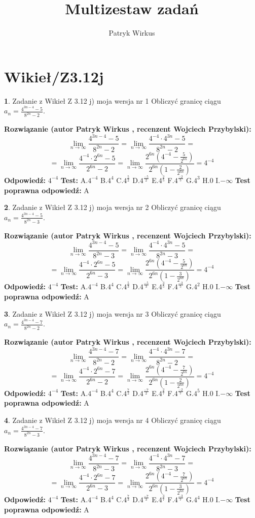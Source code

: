 \documentclass[12pt, a4paper]{article}
\title{Multizestaw zadań}
\author{Patryk Wirkus}
\date{}
\theoremstyle{definition} %
\newtheorem{zad}{}
\newcommand{\kategoria}[1]{\section{#1}}
\newcommand{\zadStart}[1]{\begin{zad}#1\newline}
\newcommand{\zadStop}{\end{zad}}
\newcommand{\rozwStart}[2]{\noindent \textbf{Rozwiązanie (autor #1 , recenzent #2): }\newline}
\newcommand{\rozwStop}{\newline}
\newcommand{\odpStart}{\noindent \textbf{Odpowiedź:}\newline}
\newcommand{\odpStop}{\newline}
\newcommand{\testStart}{\noindent \textbf{Test:}\newline}
\newcommand{\testStop}{\newline}
\newcommand{\kluczStart}{\noindent \textbf{Test poprawna odpowiedź:}\newline}
\newcommand{\kluczStop}{\newline}
\begin{document}
\maketitle

\kategoria{Wikieł/Z3.12j}


\zadStart{Zadanie z Wikieł Z 3.12 j) moja wersja nr 1}
Obliczyć granicę ciągu $a_{n}=\frac{4^{3n-4}-5}{8^{2n}-2}$.
\zadStop
\rozwStart{Patryk Wirkus}{Wojciech Przybylski}
$$\lim\limits_{n\to\infty}\frac{4^{3n-4}-5}{8^{2n}-2}= \lim\limits_{n\to\infty}\frac{4^{-4} \cdot 4^{3n}-5}{8^{2n}-2}=$$
$$= \lim\limits_{n\to\infty}\frac{4^{-4} \cdot 2^{6n}-5}{2^{6n}-2}= \lim\limits_{n\to\infty}\frac{2^{6n}(4^{-4} - \frac{5}{2^{6n}})}{2^{6n}(1-\frac{2}{2^{6n}})}= 4^{-4}$$
\rozwStop
\odpStart
$4^{-4}$
\odpStop
\testStart
A.$4^{-4}$
B.$4^{4}$
C.$4^{\frac{5}{2}}$
D.$4^{\frac{-5}{2}}$
E.$4^{\frac{2}{5}}$
F.$4^{\frac{-2}{5}}$
G.$4^{3}$
H.$0$
I.$-\infty$
\testStop
\kluczStart
A
\kluczStop



\zadStart{Zadanie z Wikieł Z 3.12 j) moja wersja nr 2}
Obliczyć granicę ciągu $a_{n}=\frac{4^{3n-4}-5}{8^{2n}-3}$.
\zadStop
\rozwStart{Patryk Wirkus}{Wojciech Przybylski}
$$\lim\limits_{n\to\infty}\frac{4^{3n-4}-5}{8^{2n}-3}= \lim\limits_{n\to\infty}\frac{4^{-4} \cdot 4^{3n}-5}{8^{2n}-3}=$$
$$= \lim\limits_{n\to\infty}\frac{4^{-4} \cdot 2^{6n}-5}{2^{6n}-3}= \lim\limits_{n\to\infty}\frac{2^{6n}(4^{-4} - \frac{5}{2^{6n}})}{2^{6n}(1-\frac{3}{2^{6n}})}= 4^{-4}$$
\rozwStop
\odpStart
$4^{-4}$
\odpStop
\testStart
A.$4^{-4}$
B.$4^{4}$
C.$4^{\frac{5}{3}}$
D.$4^{\frac{-5}{3}}$
E.$4^{\frac{3}{5}}$
F.$4^{\frac{-3}{5}}$
G.$4^{2}$
H.$0$
I.$-\infty$
\testStop
\kluczStart
A
\kluczStop



\zadStart{Zadanie z Wikieł Z 3.12 j) moja wersja nr 3}
Obliczyć granicę ciągu $a_{n}=\frac{4^{3n-4}-7}{8^{2n}-2}$.
\zadStop
\rozwStart{Patryk Wirkus}{Wojciech Przybylski}
$$\lim\limits_{n\to\infty}\frac{4^{3n-4}-7}{8^{2n}-2}= \lim\limits_{n\to\infty}\frac{4^{-4} \cdot 4^{3n}-7}{8^{2n}-2}=$$
$$= \lim\limits_{n\to\infty}\frac{4^{-4} \cdot 2^{6n}-7}{2^{6n}-2}= \lim\limits_{n\to\infty}\frac{2^{6n}(4^{-4} - \frac{7}{2^{6n}})}{2^{6n}(1-\frac{2}{2^{6n}})}= 4^{-4}$$
\rozwStop
\odpStart
$4^{-4}$
\odpStop
\testStart
A.$4^{-4}$
B.$4^{4}$
C.$4^{\frac{7}{2}}$
D.$4^{\frac{-7}{2}}$
E.$4^{\frac{2}{7}}$
F.$4^{\frac{-2}{7}}$
G.$4^{5}$
H.$0$
I.$-\infty$
\testStop
\kluczStart
A
\kluczStop



\zadStart{Zadanie z Wikieł Z 3.12 j) moja wersja nr 4}
Obliczyć granicę ciągu $a_{n}=\frac{4^{3n-4}-7}{8^{2n}-3}$.
\zadStop
\rozwStart{Patryk Wirkus}{Wojciech Przybylski}
$$\lim\limits_{n\to\infty}\frac{4^{3n-4}-7}{8^{2n}-3}= \lim\limits_{n\to\infty}\frac{4^{-4} \cdot 4^{3n}-7}{8^{2n}-3}=$$
$$= \lim\limits_{n\to\infty}\frac{4^{-4} \cdot 2^{6n}-7}{2^{6n}-3}= \lim\limits_{n\to\infty}\frac{2^{6n}(4^{-4} - \frac{7}{2^{6n}})}{2^{6n}(1-\frac{3}{2^{6n}})}= 4^{-4}$$
\rozwStop
\odpStart
$4^{-4}$
\odpStop
\testStart
A.$4^{-4}$
B.$4^{4}$
C.$4^{\frac{7}{3}}$
D.$4^{\frac{-7}{3}}$
E.$4^{\frac{3}{7}}$
F.$4^{\frac{-3}{7}}$
G.$4^{4}$
H.$0$
I.$-\infty$
\testStop
\kluczStart
A
\kluczStop
\end{document}
